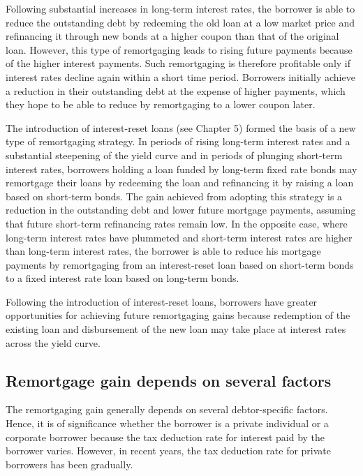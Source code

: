 \documentclass[12pt,twoside]{reedthesis}
\begin{document}
Following substantial increases in long-term interest rates, the borrower is able to reduce the outstanding debt by redeeming the old loan at a low market price and refinancing it through new bonds at a higher coupon than that of the original loan. However, this type of remortgaging leads to rising future payments because of the higher interest payments. Such remortgaging is therefore profitable only if interest rates decline again within a short time period. Borrowers initially achieve a reduction in their outstanding debt at the expense of higher payments, which they hope to be able to reduce by remortgaging to a lower coupon later.

The introduction of interest-reset loans (see Chapter 5) formed the basis of a new type of remortgaging strategy. In periods of rising long-term interest rates and a substantial steepening of the yield curve and in periods of plunging short-term interest rates, borrowers holding a loan funded by long-term fixed rate bonds may remortgage their loans by redeeming the loan and refinancing it by raising a loan based on short-term bonds. The gain achieved from adopting this strategy is a reduction in the outstanding debt and lower future mortgage payments, assuming that future short-term refinancing rates remain low. In the opposite case, where long-term interest rates have plummeted and short-term interest rates are higher than long-term interest rates, the borrower is able to reduce his mortgage payments by remortgaging from an interest-reset loan based on short-term bonds to a fixed interest rate loan based on long-term bonds.

Following the introduction of interest-reset loans, borrowers have greater opportunities for achieving future remortgaging gains because redemption of the existing loan and disbursement of the new loan may take place at interest rates across the yield curve.

\hypertarget{remortgage-gain-depends-on-several-factors}{%
\subsection{Remortgage gain depends on several factors}\label{remortgage-gain-depends-on-several-factors}}

The remortgaging gain generally depends on several debtor-specific factors. Hence, it is of significance whether the borrower is a private individual or a corporate borrower because the tax deduction rate for interest paid by the borrower varies. However, in recent years, the tax deduction rate for private borrowers has been gradually.
\end{document}
